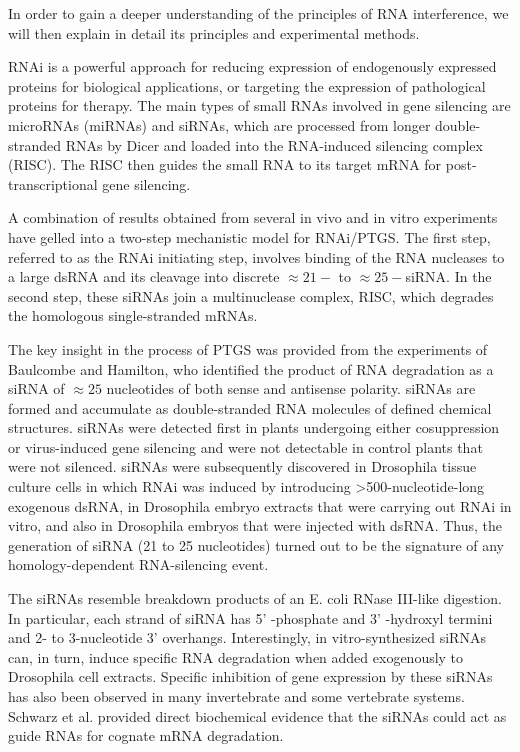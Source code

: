 \documentclass[sn-standardnature]{sn-jnl}%
\theoremstyle{thmstyleone}%
\theoremstyle{thmstyletwo}%
\theoremstyle{thmstylethree}%
\begin{document}
In order to gain a deeper understanding of the principles of RNA interference, we will then explain in detail its principles and experimental methods.

RNAi is a powerful approach for reducing expression of endogenously expressed proteins for biological applications, or targeting the expression of pathological proteins for therapy. The main types of small RNAs involved in gene silencing are microRNAs (miRNAs) and siRNAs, which are processed from longer double-stranded RNAs by Dicer and loaded into the RNA-induced silencing complex (RISC). The RISC then guides the small RNA to its target mRNA for post-transcriptional gene silencing.

A combination of results obtained from several in vivo and in vitro experiments have gelled into a two-step mechanistic model for RNAi/PTGS. The first step, referred to as the RNAi initiating step, involves binding of the RNA nucleases to a large dsRNA and its cleavage into discrete $\approx 21-$ to $\approx 25-$siRNA. In the second step, these siRNAs join a multinuclease complex, RISC, which degrades the homologous single-stranded mRNAs.

The key insight in the process of PTGS was provided from the experiments of Baulcombe and Hamilton, who identified the product of RNA degradation as a siRNA of $\approx 25$ nucleotides of both sense and antisense polarity. siRNAs are formed and accumulate as double-stranded RNA molecules of defined chemical structures. siRNAs were detected first in plants undergoing either cosuppression or virus-induced gene silencing and were not detectable in control plants that were not silenced. siRNAs were subsequently discovered in Drosophila tissue culture cells in which RNAi was induced by introducing >500-nucleotide-long exogenous dsRNA, in Drosophila embryo extracts that were carrying out RNAi in vitro, and also in Drosophila embryos that were injected with dsRNA. Thus, the generation of siRNA (21 to 25 nucleotides) turned out to be the signature of any homology-dependent RNA-silencing event.

The siRNAs resemble breakdown products of an E. coli RNase III-like digestion. In particular, each strand of siRNA has 5' -phosphate and 3' -hydroxyl termini and 2- to 3-nucleotide 3' overhangs. Interestingly, in vitro-synthesized siRNAs can, in turn, induce specific RNA degradation when added exogenously to Drosophila cell extracts. Specific inhibition of gene expression by these siRNAs has also been observed in many invertebrate and some vertebrate systems.  Schwarz et al. provided direct biochemical evidence that the siRNAs could act as guide RNAs for cognate mRNA degradation.
\end{document}
